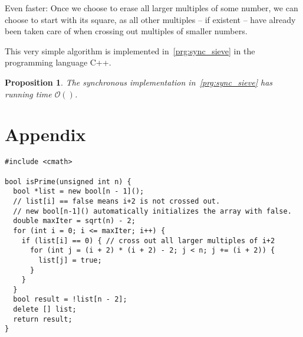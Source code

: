 \documentclass[a4paper,12pt]{article}
\newtheorem{proposition}{Proposition}
\newcommand{\bigO}{\mathcal{O}}
\begin{document}
Even faster: Once we choose to erase all larger multiples of some number, we can choose to start with its square, as all other multiples -- if existent -- have already been taken care of when crossing out multiples of smaller numbers.

This very simple algorithm is implemented in~\autoref{prg:sync_sieve} in the programming language C++.

\begin{proposition}
	The synchronous implementation in~\autoref{prg:sync_sieve} has running time $\bigO()$.
\end{proposition}

\appendix
\section{Appendix}
 	\begin{lstlisting}[caption={Synchronous implementation of the Sieve of Eratosthenes}, label={prg:sync_sieve}, frame={single}]
#include <cmath>
	
bool isPrime(unsigned int n) {
  bool *list = new bool[n - 1]();
  // list[i] == false means i+2 is not crossed out.
  // new bool[n-1]() automatically initializes the array with false.
  double maxIter = sqrt(n) - 2;
  for (int i = 0; i <= maxIter; i++) {
    if (list[i] == 0) { // cross out all larger multiples of i+2
      for (int j = (i + 2) * (i + 2) - 2; j < n; j += (i + 2)) {
        list[j] = true;
      }
    }
  }
  bool result = !list[n - 2];
  delete [] list;
  return result;
}
	\end{lstlisting}
	
\end{document}
